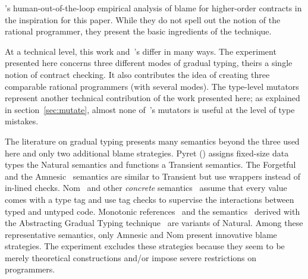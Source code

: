 
\citet{lksfd-popl-2020}'s human-out-of-the-loop empirical analysis of blame for
higher-order contracts in the inspiration for this paper.  While they do not
spell out the notion of the rational programmer, they present the basic
ingredients of the technique.

At a technical level, this work and~\citet{lksfd-popl-2020}'s differ in
many ways. The experiment presented here concerns three different
modes of gradual typing, theirs a single notion of contract checking.
It also contributes the idea of creating three comparable rational
programmers (with several modes). The type-level mutators represent
another technical contribution of the work presented here; as
explained in section~\ref{sec:mutate}, almost none
of~\citet{lksfd-popl-2020}'s mutators is useful at the level of type
mistakes.

The literature on gradual typing presents many semantics beyond the three used
here and only two additional blame strategies.  Pyret
() assigns fixed-size data types the Natural
semantics and functions a Transient semantics. The Forgetful~\cite{cl-icfp-2017}
and the Amnesic~\cite{gfd-oopsla-2019} semantics are similar to Transient but
use wrappers instead of in-lined checks.  Nom~\cite{mt-oopsla-2017} and other
\emph{concrete\/} semantics~\cite{wnlov-popl-2010, rsfbv-popl-2015,
rzv-ecoop-2015, rat-oopsla-2017} assume that every value comes with a type tag
and use tag checks to supervise the interactions between typed and untyped code.
Monotonic references~\cite{svctg-esop-2015} and the
semantics~\cite{tlt-popl-2019, etg-icfp-19, tt-scp-20, tgt-popl-18, tt-sas-17}
derived with the Abstracting Gradual Typing technique~\cite{gct-popl-2016} are
variants of Natural.  Among these representative semantics, only Amnesic and Nom
present innovative blame strategies.  The experiment excludes these strategies
because they seem to be merely theoretical constructions and/or impose severe
restrictions on programmers.
 
